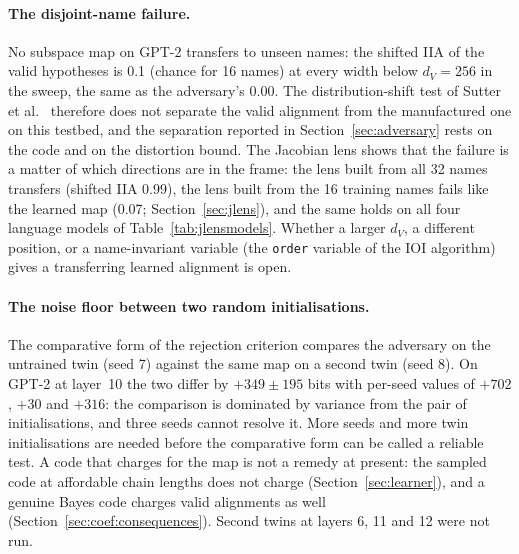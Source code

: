 \documentclass[11pt,a4paper]{article}
\newcommand{\dv}{d_V}
\begin{document}
\paragraph{The disjoint-name failure.} No subspace map on GPT-2 transfers to unseen names: the shifted IIA of the valid hypotheses is 0.1 (chance for 16 names) at every width below $\dv=256$ in the sweep, the same as the adversary's 0.00. The distribution-shift test of Sutter et al.\ \cite{sutter2025} therefore does not separate the valid alignment from the manufactured one on this testbed, and the separation reported in Section~\ref{sec:adversary} rests on the code and on the distortion bound. The Jacobian lens shows that the failure is a matter of which directions are in the frame: the lens built from all 32 names transfers (shifted IIA 0.99), the lens built from the 16 training names fails like the learned map (0.07; Section~\ref{sec:jlens}), and the same holds on all four language models of Table~\ref{tab:jlensmodels}. Whether a larger $\dv$, a different position, or a name-invariant variable (the \texttt{order} variable of the IOI algorithm) gives a transferring learned alignment is open.

\paragraph{The noise floor between two random initialisations.} The comparative form of the rejection criterion compares the adversary on the untrained twin (seed 7) against the same map on a second twin (seed 8). On GPT-2 at layer~10 the two differ by $+349\pm195$ bits with per-seed values of $+702$, $+30$ and $+316$: the comparison is dominated by variance from the pair of initialisations, and three seeds cannot resolve it. More seeds and more twin initialisations are needed before the comparative form can be called a reliable test. A code that charges for the map is not a remedy at present: the sampled code at affordable chain lengths does not charge (Section~\ref{sec:learner}), and a genuine Bayes code charges valid alignments as well (Section~\ref{sec:coef:consequences}). Second twins at layers 6, 11 and 12 were not run.
\end{document}
